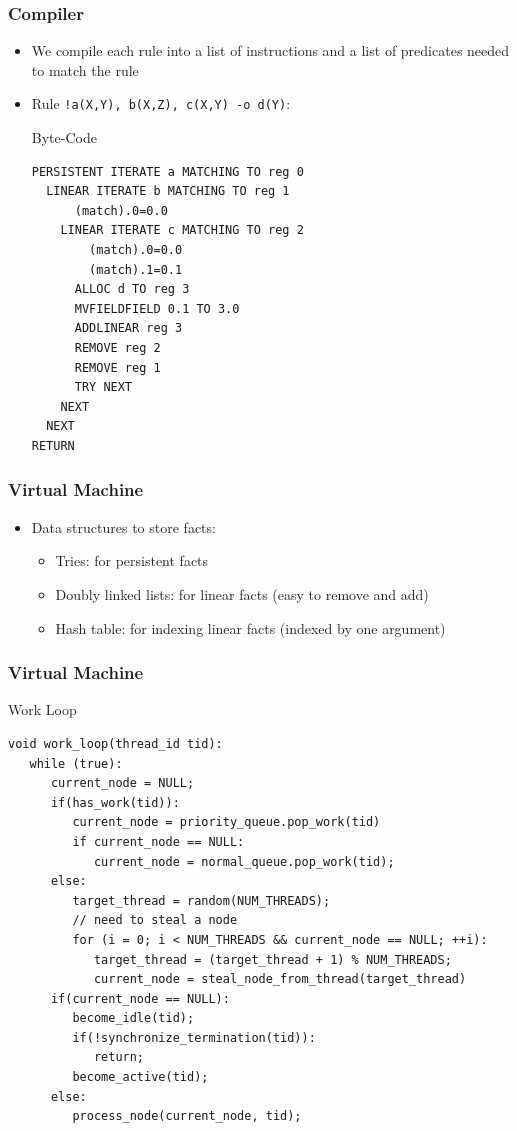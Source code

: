 \documentclass{beamer}
\begin{document}
\begin{frame}[fragile]
   \frametitle{Compiler}
   \begin{itemize}
      \item We compile each rule into a list of instructions and a list of predicates needed to match the rule
      \item Rule \texttt{!a(X,Y), b(X,Z), c(X,Y) -o d(Y)}:
      \begin{block}{Byte-Code}
         \scriptsize\begin{verbatim}
PERSISTENT ITERATE a MATCHING TO reg 0
  LINEAR ITERATE b MATCHING TO reg 1
      (match).0=0.0
    LINEAR ITERATE c MATCHING TO reg 2
        (match).0=0.0
        (match).1=0.1
      ALLOC d TO reg 3
      MVFIELDFIELD 0.1 TO 3.0
      ADDLINEAR reg 3
      REMOVE reg 2
      REMOVE reg 1
      TRY NEXT
    NEXT
  NEXT
RETURN
         \end{verbatim}
      \end{block}
   \end{itemize}
\end{frame}

\begin{frame}[fragile]
   \frametitle{Virtual Machine}
   \begin{itemize}
      \item Data structures to store facts:
      \begin{itemize}
         \item Tries: for persistent facts
         \item Doubly linked lists: for linear facts (easy to remove and add)
         \item Hash table: for indexing linear facts (indexed by one argument)
      \end{itemize}
   \end{itemize}
\end{frame}


\begin{frame}[fragile]
   \frametitle{Virtual Machine}
   \begin{block}{Work Loop}
   \scriptsize
\begin{verbatim}
void work_loop(thread_id tid):
   while (true):
      current_node = NULL;
      if(has_work(tid)):
         current_node = priority_queue.pop_work(tid)
         if current_node == NULL:
            current_node = normal_queue.pop_work(tid);
      else:
         target_thread = random(NUM_THREADS);
         // need to steal a node
         for (i = 0; i < NUM_THREADS && current_node == NULL; ++i):
            target_thread = (target_thread + 1) % NUM_THREADS;
            current_node = steal_node_from_thread(target_thread)
      if(current_node == NULL):
         become_idle(tid);
         if(!synchronize_termination(tid)):
            return;
         become_active(tid);
      else:
         process_node(current_node, tid);
   \end{verbatim}
   \end{block}
\end{frame}
\end{document}

